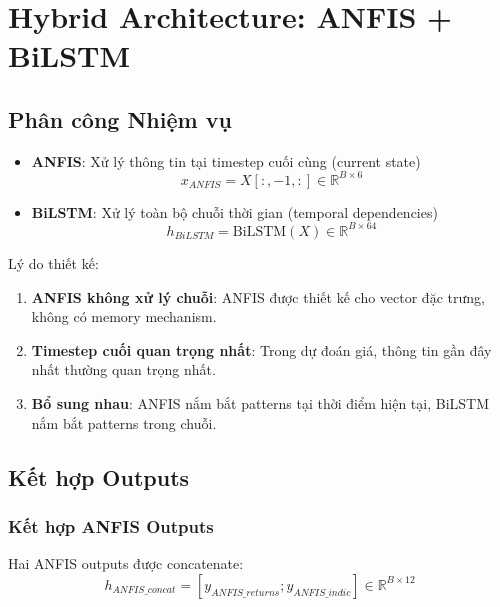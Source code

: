 \documentclass[12pt,a4paper]{article}
\begin{document}
\section{Hybrid Architecture: ANFIS + BiLSTM}

\subsection{Phân công Nhiệm vụ}

\begin{itemize}
    \item \textbf{ANFIS}: Xử lý thông tin tại timestep cuối cùng (current state)
    \begin{equation}
    x_{ANFIS} = X[:, -1, :] \in \mathbb{R}^{B \times 6}
    \end{equation}
    
    \item \textbf{BiLSTM}: Xử lý toàn bộ chuỗi thời gian (temporal dependencies)
    \begin{equation}
    h_{BiLSTM} = \text{BiLSTM}(X) \in \mathbb{R}^{B \times 64}
    \end{equation}
\end{itemize}

Lý do thiết kế:
\begin{enumerate}
    \item \textbf{ANFIS không xử lý chuỗi}: ANFIS được thiết kế cho vector đặc trưng, không có memory mechanism.
    \item \textbf{Timestep cuối quan trọng nhất}: Trong dự đoán giá, thông tin gần đây nhất thường quan trọng nhất.
    \item \textbf{Bổ sung nhau}: ANFIS nắm bắt patterns tại thời điểm hiện tại, BiLSTM nắm bắt patterns trong chuỗi.
\end{enumerate}

\subsection{Kết hợp Outputs}

\subsubsection{Kết hợp ANFIS Outputs}

Hai ANFIS outputs được concatenate:
\begin{equation}
h_{ANFIS\_concat} = [y_{ANFIS\_returns}; y_{ANFIS\_indic}] \in \mathbb{R}^{B \times 12}
\end{equation}
\end{document}
